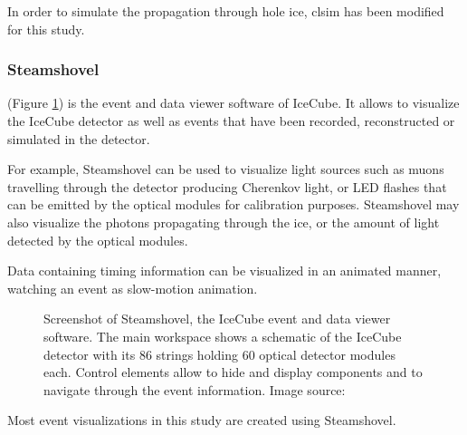 
In order to simulate the propagation through hole ice, clsim has been modified for this study.




\subsubsection{Steamshovel}

 (Figure \ref{fig:steamshovel}) is the event and data viewer software of IceCube. It allows to visualize the IceCube detector as well as events that have been recorded, reconstructed or simulated in the detector.

For example, Steamshovel can be used to visualize light sources such as muons travelling through the detector producing Cherenkov light, or LED flashes that can be emitted by the optical modules for calibration purposes. Steamshovel may also visualize the photons propagating through the ice, or the amount of light detected by the optical modules.

Data containing timing information can be visualized in an animated manner, watching an event as slow-motion animation.

\begin{figure}
  \label{fig:steamshovel}
  \caption{Screenshot of Steamshovel, the IceCube event and data viewer software. The main workspace shows a schematic of the IceCube detector with its 86 strings holding 60 optical detector modules each. Control elements allow to hide and display components and to navigate through the event information. Image source: \cite{steamshoveldocumentation}}
\end{figure}

Most event visualizations in this study are created using Steamshovel.

